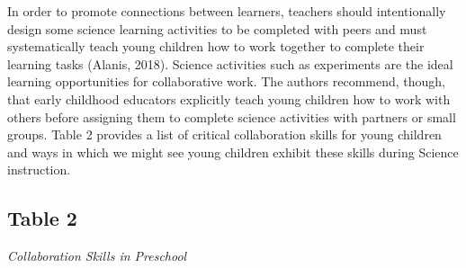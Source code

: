 \documentclass[11.5pt]{sig-alternate}
\begin{document}
\begin{large}
In order to promote connections between learners, teachers should intentionally design some science learning activities to be completed with peers and must systematically teach young children how to work together to complete their learning tasks (Alanis, 2018). Science activities such as experiments are the ideal learning opportunities for collaborative work. The authors recommend, though, that early childhood educators explicitly teach young children how to work with others before assigning them to complete science activities with partners or small groups. Table 2 provides a list of critical collaboration skills for young children and ways in which we might see young children exhibit these skills during Science instruction.

\subsection*{Table 2}
\textit{Collaboration Skills in Preschool}
\begin{table}[h!]
\label{tab:table-2}
\end{table}
\end{large}
\end{document}
